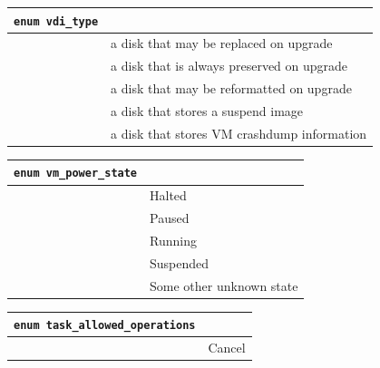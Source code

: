 \vspace{1cm}
\begin{longtable}{|ll|}
\hline
{\tt enum vdi\_type} & \\
\hline
\hspace{0.5cm}{\tt system} & a disk that may be replaced on upgrade \\
\hspace{0.5cm}{\tt user} & a disk that is always preserved on upgrade \\
\hspace{0.5cm}{\tt ephemeral} & a disk that may be reformatted on upgrade \\
\hspace{0.5cm}{\tt suspend} & a disk that stores a suspend image \\
\hspace{0.5cm}{\tt crashdump} & a disk that stores VM crashdump information \\
\hline
\end{longtable}

\vspace{1cm}
\begin{longtable}{|ll|}
\hline
{\tt enum vm\_power\_state} & \\
\hline
\hspace{0.5cm}{\tt Halted} & Halted \\
\hspace{0.5cm}{\tt Paused} & Paused \\
\hspace{0.5cm}{\tt Running} & Running \\
\hspace{0.5cm}{\tt Suspended} & Suspended \\
\hspace{0.5cm}{\tt Unknown} & Some other unknown state \\
\hline
\end{longtable}

\vspace{1cm}
\begin{longtable}{|ll|}
\hline
{\tt enum task\_allowed\_operations} & \\
\hline
\hspace{0.5cm}{\tt Cancel} & Cancel \\
\hline
\end{longtable}

